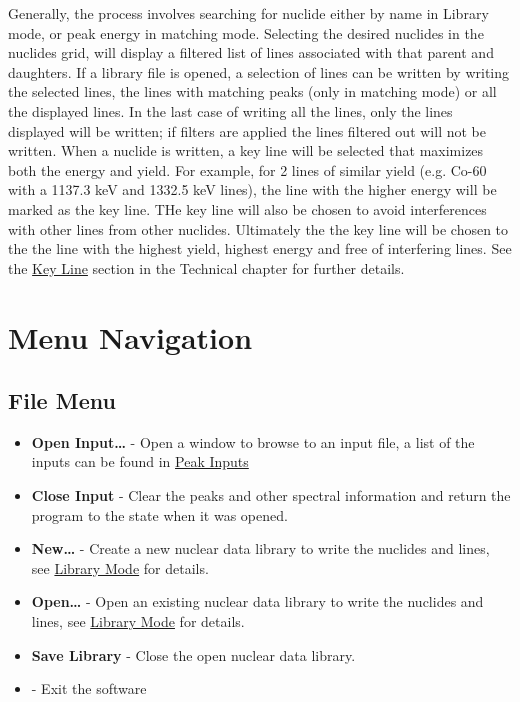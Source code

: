 \documentclass[12pt,report,justified]{SANDreport}
\begin{document}
Generally, the process involves searching for nuclide either by name in Library mode, or peak energy in matching
mode. Selecting the desired nuclides in the nuclides grid, will display a filtered list of lines associated with
that parent and daughters. If a library file is opened, a selection of lines can be written by writing the selected
lines, the lines with matching peaks (only in matching mode) or all the displayed lines. In the last case of writing
all the lines, only the lines displayed will be written; if filters are applied the lines filtered out will not be
written. When a nuclide is written, a key line will be selected that maximizes both the energy and yield. For example,
for 2 lines of similar yield (e.g. Co-60 with a 1137.3 keV and 1332.5 keV lines), the line with the higher energy
will be marked as the key line. THe key line will also be chosen to avoid interferences with other lines from other
nuclides. Ultimately the the key line will be chosen to the the line with the highest yield, highest energy and
free of interfering lines. See the \hyperref[sec:key_line]{Key Line} section in the Technical chapter for further
details.


\section{Menu Navigation}\label{sec:menu}
\subsection{File Menu}\label{sec:file_menu}
\begin{itemize}
    \item \textbf{Open Input\ldots} - Open a window to browse to an input file, a list of the inputs can be found
        in \hyperref[sec:peak_inp]{Peak Inputs}
    \item \textbf{Close Input} - Clear the peaks and other spectral information and return the program to the state
        when it was opened.
    \item \textbf{New\ldots} - Create a new nuclear data library to write the nuclides and lines, see
        \hyperref[sec:lib_mode]{Library Mode} for details.
    \item \textbf{Open\ldots} - Open an existing nuclear data library to write the nuclides and lines, see
        \hyperref[sec:lib_mode]{Library Mode} for details.
    \item \textbf{Save Library} - Close the open nuclear data library.
    \item {} - Exit the software
\end{itemize}
\end{document}

